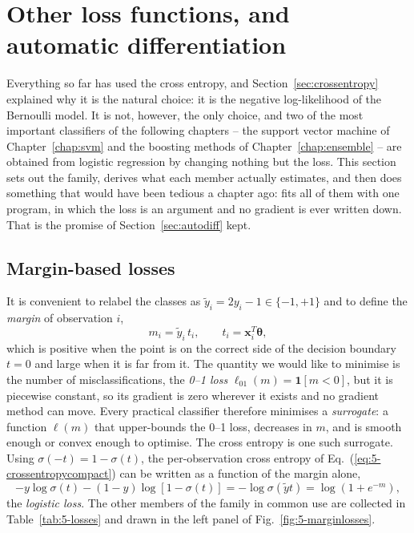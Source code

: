 \section{Other loss functions, and automatic differentiation}
\label{sec:logreglosses}

Everything so far has used the cross entropy, and Section~\ref{sec:crossentropy}
explained why it is the natural choice: it is the negative log-likelihood of
the Bernoulli model.  It is not, however, the only choice, and two of the most
important classifiers of the following chapters -- the support vector machine
of Chapter~\ref{chap:svm} and the boosting methods of
Chapter~\ref{chap:ensemble} -- are obtained from logistic regression by
changing nothing but the loss.  This section sets out the family, derives
what each member actually estimates, and then does something that would have
been tedious a chapter ago: fits all of them with one program, in which the
loss is an argument and no gradient is ever written down.  That is the
promise of Section~\ref{sec:autodiff} kept.

\subsection{Margin-based losses}
\label{sec:marginlosses}

It is convenient to relabel the classes as $\tilde y_i=2y_i-1\in\{-1,+1\}$ and
to define the \emph{margin} of observation $i$,
\begin{equation}
  m_i = \tilde y_i\,t_i,
  \qquad t_i=\bm{x}_i^{T}\bm{\theta},
  \label{eq:5-margin}
\end{equation}
which is positive when the point is on the correct side of the decision
boundary $t=0$ and large when it is far from it.  The quantity we would like
to minimise is the number of misclassifications, the \emph{0--1 loss}
$\ell_{01}(m)=\mathbf{1}[m<0]$, but it is piecewise constant, so its
gradient is zero wherever it exists and no gradient method can move.  Every
practical classifier therefore minimises a \emph{surrogate}: a function
$\ell(m)$ that upper-bounds the 0--1 loss, decreases in $m$, and is smooth
enough or convex enough to optimise.  The cross entropy is one such surrogate.
Using $\sigma(-t)=1-\sigma(t)$, the per-observation cross entropy of
Eq.~(\ref{eq:5-crossentropycompact}) can be written as a function of the
margin alone,
\begin{equation}
  -y\log\sigma(t)-(1-y)\log[1-\sigma(t)]
   = -\log\sigma(\tilde y t) = \log\left(1+e^{-m}\right),
  \label{eq:5-logisticloss}
\end{equation}
the \emph{logistic loss}.  The other members of the family in common use are
collected in Table~\ref{tab:5-losses} and drawn in the left panel of
Fig.~\ref{fig:5-marginlosses}.

